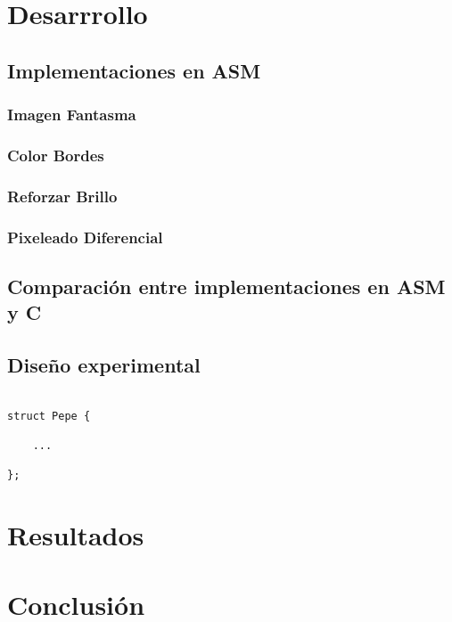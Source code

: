 \documentclass[a4paper]{article}
\newenvironment{codesnippet}{%
	\begin{Sbox}\begin{minipage}{\textwidth}\sffamily\small}%
	{\end{minipage}\end{Sbox}%
		\begin{center}%
		\vspace{-0.4cm}\colorbox{litegrey}{\TheSbox}\end{center}\vspace{0.3cm}}
\begin{document}
\section{Desarrrollo}

\subsection{Implementaciones en ASM}

\subsubsection{Imagen Fantasma}

\subsubsection{Color Bordes}

\subsubsection{Reforzar Brillo}

\subsubsection{Pixeleado Diferencial}




\subsection{Comparación entre implementaciones en ASM y C}

\subsection{Diseño experimental}

\begin{codesnippet}
\begin{verbatim}

struct Pepe {

    ...

};

\end{verbatim}
\end{codesnippet}


\section{Resultados}
%

\section{Conclusión}
\end{document}
